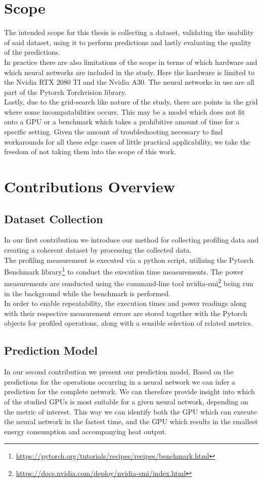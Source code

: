 \section{Scope}
The intended scope for this thesis is collecting a dataset, validating the usability of said dataset, using it to perform predictions and lastly evaluating the quality of the predictions. \\
In practice there are also limitations of the scope in terms of which hardware and which neural networks are included in the study. Here the hardware is limited to the Nvidia RTX 2080 TI and the Nvidia A30. The neural networks in use are all part of the Pytorch Torchvision library. \\
Lastly, due to the grid-search like nature of the study, there are points in the grid where some incompatabilities occurs. This may be a model which does not fit onto a GPU or a benchmark which takes a prohibitive amount of time for a specific setting. Given the amount of troubleshooting necessary to find workarounds for all these edge cases of little practical applicability, we take the freedom of not taking them into the scope of this work.


\section{Contributions Overview}
\subsection{Dataset Collection}
In our first contribution we introduce our method for collecting 
profiling data and creating a coherent dataset by processing the 
collected data.\\
The profiling measurement is executed via a python script, utilizing
the Pytorch Benchmark 
library\footnote{\url{https://pytorch.org/tutorials/recipes/recipes/benchmark.html}}
to conduct the execution time measurements. The power measurements
are conducted using the command-line tool 
nvidia-smi\footnote{\url{https://docs.nvidia.com/deploy/nvidia-smi/index.html}}
being run in the background while the benchmark is performed.\\
In order to enable repeatability, the execution times and power readings
along with their respective measurement errors are stored together with the
Pytorch objects for profiled operations, along with a sensible selection of
related metrics.

\subsection{Prediction Model}
In our second contribution we present our prediction model. Based on the predictions
for the operations occurring in a neural network we can infer a prediction for the 
complete network. We can therefore provide insight into which of the studied GPUs
is most suitable for a given neural network, depending on the metric of interest.
This way we can identify both the GPU which can execute the neural network in the
fastest time, and the GPU which results in the smallest energy consumption and
accompanying heat output.

